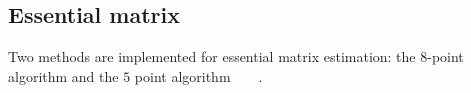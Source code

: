 \subsection{Essential matrix}
Two methods are implemented for essential matrix estimation: the $8$-point algorithm and the $5$ point algorithm~\cite{nister2003efficient}~\cite{li2006five}~\cite{triggs2000routines}~\cite{nister2004efficient}.